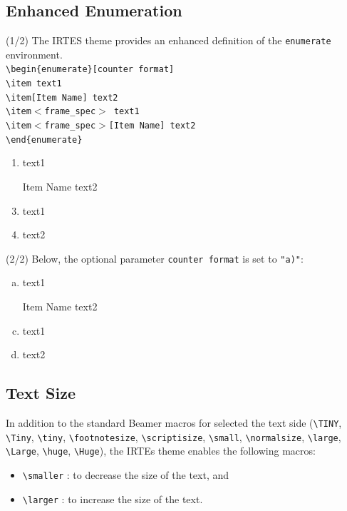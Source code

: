 \documentclass[english,circlenumberstyle]{irtesbeamer}
\begin{document}
\subsection{Enhanced Enumeration}
\begin{frame}{\subsecname (1/2)}
	The IRTES theme provides an enhanced definition of the \texttt{enumerate} environment. \\[.5cm]
	{\smaller
	\texttt{{\textbackslash}begin\{enumerate\}[counter format]} \\
	\texttt{{\textbackslash}item text1} \\
	\texttt{{\textbackslash}item[Item Name] text2} \\
	\texttt{{\textbackslash}item$<$frame\_spec$>$ text1} \\
	\texttt{{\textbackslash}item$<$frame\_spec$>$[Item Name] text2} \\
	\texttt{{\textbackslash}end\{enumerate\}}} \\[.5cm]
	\begin{enumerate}
	\item text1
	\item[Item Name] text2
	\item<2> text1
	\item<2>[Item Name] text2
	\end{enumerate}
\end{frame}

\begin{frame}{\subsecname (2/2)}
	Below, the optional parameter \texttt{counter format} is set to \texttt{"a)"}: \\[.5cm]
	\begin{enumerate}[a)]
	\item text1
	\item[Item Name] text2
	\item<2> text1
	\item<2>[Item Name] text2
	\end{enumerate}
\end{frame}

\subsection{Text Size}

\begin{frame}{\subsecname}
	In addition to the standard Beamer macros for selected the text side (\texttt{{\textbackslash}TINY}, \texttt{{\textbackslash}Tiny}, \texttt{{\textbackslash}tiny}, \texttt{{\textbackslash}footnotesize}, \texttt{{\textbackslash}scriptisize}, \texttt{{\textbackslash}small}, \texttt{{\textbackslash}normalsize}, \texttt{{\textbackslash}large}, \texttt{{\textbackslash}Large}, \texttt{{\textbackslash}huge}, \texttt{{\textbackslash}Huge}), the IRTEs theme enables the following macros:
	\begin{itemize}
	\item \texttt{{\textbackslash}smaller} : to decrease the size of the text, and
	\item \texttt{{\textbackslash}larger} : to increase the size of the text.
	\end{itemize}
\end{frame}
\makeatother
\end{document}
